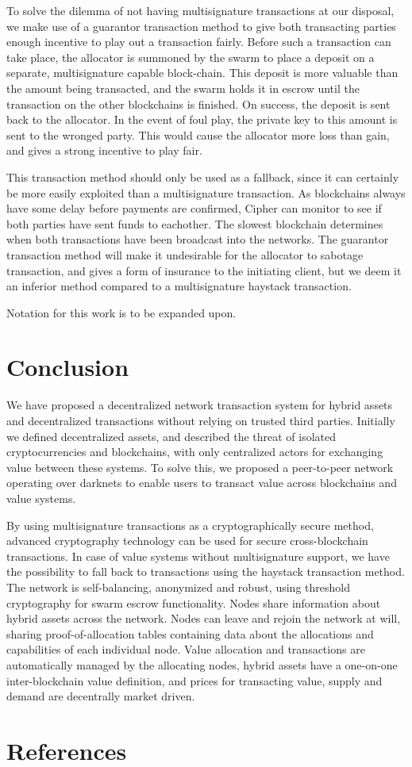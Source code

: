 \documentclass[11pt, a4paper]{article}
\begin{document}
To solve the dilemma of not having multisignature transactions at our disposal, we make use of a guarantor transaction method to give both transacting parties enough incentive to play out a transaction fairly. Before such a transaction can take place, the allocator is summoned by the swarm to place a deposit on a separate, multisignature capable block-chain. This deposit is more valuable than the amount being transacted, and the swarm holds it in escrow until the transaction on the other blockchains is finished. On success, the deposit is sent back to the allocator. In the event of foul play, the private key to this amount is sent to the wronged party. This would cause the allocator more loss than gain, and gives a strong incentive to play fair.

This transaction method should only be used as a fallback, since it can certainly be more easily exploited than a multisignature transaction. As blockchains always have some delay before payments are confirmed, Cipher can monitor to see if both parties have sent funds to eachother. The slowest blockchain determines when both transactions have been broadcast into the networks. The guarantor transaction method will make it undesirable for the allocator to sabotage transaction, and gives a form of insurance to the initiating client, but we deem it an inferior method compared to a multisignature haystack transaction.

Notation for this work is to be expanded upon.


\section{Conclusion}

We have proposed a decentralized network transaction system for hybrid assets and decentralized transactions without relying on trusted third parties. Initially we defined decentralized assets, and described the threat of isolated cryptocurrencies and blockchains, with only centralized actors for exchanging value between these systems. To solve this, we proposed a peer-to-peer network operating over darknets to enable users to transact value across blockchains and value systems. 

By using multisignature transactions as a cryptographically secure method, advanced cryptography technology can be used for secure cross-blockchain transactions. In case of value systems without multisignature support, we have the possibility to fall back to transactions using the haystack transaction method. The network is self-balancing, anonymized and robust, using threshold cryptography for swarm escrow functionality. Nodes share information about hybrid assets across the network. Nodes can leave and rejoin the network at will, sharing proof-of-allocation tables containing data about the allocations and capabilities of each individual node. Value allocation and transactions are automatically managed by the allocating nodes, hybrid assets have a one-on-one inter-blockchain value definition, and prices for transacting value, supply and demand are decentrally market driven.


\section{References}


{}
\end{document}
